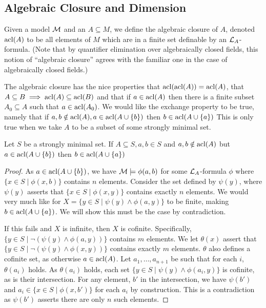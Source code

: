 \subsection{Algebraic Closure and Dimension}

\begin{definition}\label{definition_algebraic_closure}
Given a model \(\mathcal{M}\) and an \(A \subseteq M\), we define the algebraic closure of \(A\), denoted \(\text{acl}(A)\) to be all elements of \(M\) which are in a finite set definable by an \(\mathcal{L}_A\)-formula. 
(Note that by quantifier elimination over algebraically closed fields, this notion of ``algebraic closure'' agrees with the familiar one in the case of algebraically closed fields.)
\end{definition}

The algebraic closure has the nice properties that \(\text{acl}(\text{acl}(A)) = \text{acl}(A)\), that \(A \subseteq B \implies \text{acl}(A) \subseteq \text{acl}(B)\) and that if \(a \in \text{acl}(A)\) then there is a finite subset \(A_0 \subseteq A\) such that \(a \in \text{acl}(A_0)\).
We would like the exchange property to be true, namely that if \(a, b \notin \text{acl}(A), a \in \text{acl}(A \cup \{b\})\) then \(b \in \text{acl}(A \cup \{a\})\) 
This is only true when we take \(A\) to be a subset of some strongly minimal set.

\begin{theorem}\label{theorem_exchange}
Let \(S\) be a strongly minimal set. If \(A \subseteq S, a, b \in S\) and \(a, b \notin \text{acl}(A)\) but \(a \in \text{acl}(A \cup \{b\})\) then \(b \in \text{acl}(A \cup \{a\})\) 
\end{theorem}

\begin{proof}
As \(a \in \text{acl}(A \cup \{b\})\), we have \(\mathcal{M} \models \phi(a, b)\) for some \(\mathcal{L}_A\)-formula \(\phi\) where \(\{x \in S \mid \phi(x, b)\}\) contains \(n\) elements. 
Consider the set defined by \(\psi(y)\), where \(\psi(y)\) asserts that \(\{x \in S \mid \phi(x, y)\}\) contains exactly \(n\) elements. 
We would very much like for \(X = \{y \in S \mid \psi(y) \land \phi(a, y)\}\) to be finite, making \(b \in \text{acl}(A \cup \{a\})\). 
We will show this must be the case by contradiction.

If this fails and \(X\) is infinite, then \(X\) is cofinite. 
Specifically, \(\{y \in S \mid \neg(\psi(y) \land \phi(a, y))\}\) contains \(m\) elements.  
We let \(\theta(x)\) assert that \(\{y \in S \mid \neg(\psi(y) \land \phi(x, y))\}\) contains exactly \(m\) elements.
\(\theta\) also defines a cofinite set, as otherwise \(a \in \text{acl}(A)\).   
Let \(a_1, \ldots, a_{n+1}\) be such that for each \(i\), \(\theta(a_i)\) holds.
As \(\theta(a_i)\) holds, each set \(\{y \in S \mid \psi(y) \land \phi(a_i, y)\}\) is cofinite, as is their intersection. 
For any element, \(b'\) in the intersection, we have \(\psi(b')\) and \(a_i \in \{x \in S \mid \phi(x, b')\}\) for each \(a_i\) by construction.
This is a contradiction as \(\psi(b')\) asserts there are only \(n\) such elements.  
\end{proof}

